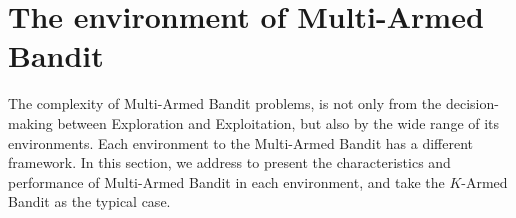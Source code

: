 %

\let\textcircled=\pgftextcircled

\section{The environment of Multi-Armed Bandit}
\label{sec:environment}

The complexity of Multi-Armed Bandit problems, is not only from the decision-making between Exploration and Exploitation, but also by the wide range of its environments. Each environment to the Multi-Armed Bandit has a different framework. In this section, we address to present the characteristics and performance of Multi-Armed Bandit in each environment, and take the $K$-Armed Bandit as the typical case.






